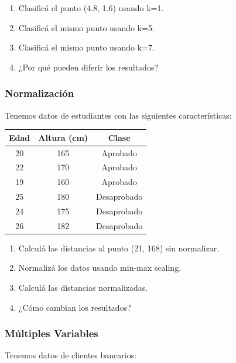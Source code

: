 \documentclass[12pt]{article}
\begin{document}
\begin{enumerate}
    \item Clasificá el punto (4.8, 1.6) usando k=1.
    \item Clasificá el mismo punto usando k=5.
    \item Clasificá el mismo punto usando k=7.
    \item ¿Por qué pueden diferir los resultados?
\end{enumerate}

\subsubsection{Normalización}

Tenemos datos de estudiantes con las siguientes características:

\begin{table}[H]
    \centering
    \begin{tabular}{ccc}
        \toprule
        \textbf{Edad} & \textbf{Altura (cm)} & \textbf{Clase} \\
        \midrule
        20 & 165 & Aprobado \\
        22 & 170 & Aprobado \\
        19 & 160 & Aprobado \\
        25 & 180 & Desaprobado \\
        24 & 175 & Desaprobado \\
        26 & 182 & Desaprobado \\
        \bottomrule
    \end{tabular}
\end{table}

\begin{enumerate}
    \item Calculá las distancias al punto (21, 168) sin normalizar.
    \item[b)] Normalizá los datos usando min-max scaling.
    \item[c)] Calculá las distancias normalizadas.
    \item[d)] ¿Cómo cambian los resultados?
\end{enumerate}

\subsubsection{Múltiples Variables}

Tenemos datos de clientes bancarios:
\end{document}
